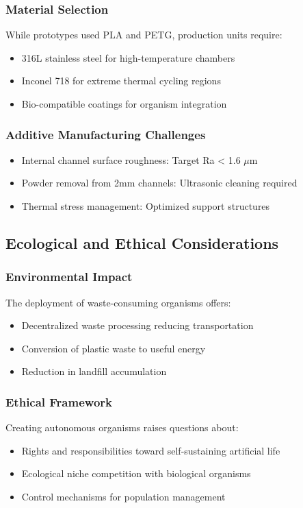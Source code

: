 \subsubsection{Material Selection}
While prototypes used PLA and PETG, production units require:
\begin{itemize}
    \item 316L stainless steel for high-temperature chambers
    \item Inconel 718 for extreme thermal cycling regions
    \item Bio-compatible coatings for organism integration
\end{itemize}

\subsubsection{Additive Manufacturing Challenges}
\begin{itemize}
    \item Internal channel surface roughness: Target Ra < 1.6 $\mu$m
    \item Powder removal from 2mm channels: Ultrasonic cleaning required
    \item Thermal stress management: Optimized support structures
\end{itemize}

\subsection{Ecological and Ethical Considerations}

\subsubsection{Environmental Impact}
The deployment of waste-consuming organisms offers:
\begin{itemize}
    \item Decentralized waste processing reducing transportation
    \item Conversion of plastic waste to useful energy
    \item Reduction in landfill accumulation
\end{itemize}

\subsubsection{Ethical Framework}
Creating autonomous organisms raises questions about:
\begin{itemize}
    \item Rights and responsibilities toward self-sustaining artificial life
    \item Ecological niche competition with biological organisms
    \item Control mechanisms for population management
\end{itemize}


